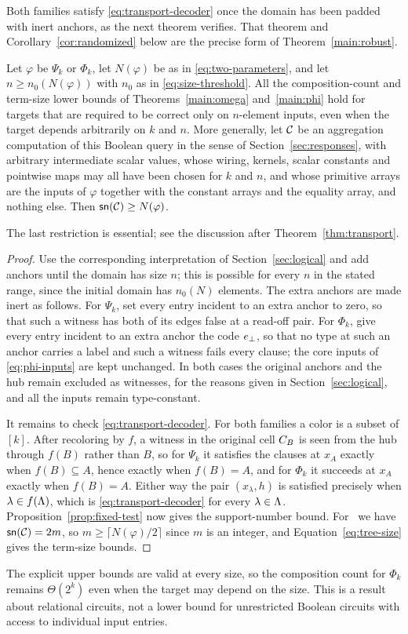Both families satisfy \eqref{eq:transport-decoder} once the domain has been
padded with inert anchors, as the next theorem verifies. That theorem and
Corollary~\ref{cor:randomized} below are the precise form of
Theorem~\ref{main:robust}.
\begin{theorem}\label{thm:fixed-size}
Let $\varphi$ be $\Psi_k$ or $\Phi_k$, let $N(\varphi)$ be as in
\eqref{eq:two-parameters}, and let $n\ge n_0(N(\varphi))$ with $n_0$ as in
\eqref{eq:size-threshold}. All the composition-count and term-size lower
bounds of Theorems~\ref{main:omega} and~\ref{main:phi} hold for targets that
are required to be correct only on $n$-element inputs, even when the target
depends arbitrarily on $k$ and $n$.
More generally, let $\mathcal C$ be an aggregation computation of this Boolean
query in the sense of Section~\ref{sec:responses}, with arbitrary
intermediate scalar values, whose wiring, kernels, scalar constants and
pointwise maps may all have been chosen for $k$ and $n$, and whose primitive
arrays are the inputs of $\varphi$ together with the constant arrays and the
equality array, and nothing else. Then $\mathsf{sn}(\mathcal C)\ge N(\varphi)$.
\end{theorem}
The last restriction is essential; see the discussion after
Theorem~\ref{thm:transport}.
\begin{proof}
Use the corresponding interpretation of Section~\ref{sec:logical} and add
anchors until the domain has size $n$; this is possible for every $n$ in
the stated range, since the initial domain has $n_0(N)$ elements. The extra
anchors are made inert as follows. For $\Psi_k$, set every entry incident
to an extra anchor to
zero, so that such a witness has both of its edges false at a read-off
pair. For $\Phi_k$, give every entry incident to an extra anchor the code
$e_{\bot}$, so that no type at such an anchor carries a label and such a witness
fails every clause; the core inputs of \eqref{eq:phi-inputs} are kept
unchanged. In both cases the original anchors
and the hub remain excluded as witnesses, for the reasons given in
Section~\ref{sec:logical}, and all the inputs remain type-constant.

It remains to check \eqref{eq:transport-decoder}. For both families a color
is a subset of $[k]$. After recoloring by $f$, a witness in the original
cell $C_{B}$ is seen from the hub through $f(B)$ rather than $B$, so for
$\Psi_k$ it satisfies the clauses at $x_A$ exactly when $f(B)\subseteq A$,
hence exactly when $f(B)=A$, and for $\Phi_k$ it succeeds at $x_A$ exactly
when $f(B)=A$. Either way the pair $(x_\lambda,h)$ is satisfied precisely
when $\lambda\in f(\Lambda)$, which is \eqref{eq:transport-decoder} for every
$\lambda\in\Lambda$.
Proposition~\ref{prop:fixed-test} now gives the support-number bound. For
\CoR\ we have $\mathsf{sn}(\mathcal C)=2m$, so $m\ge\lceil N(\varphi)/2\rceil$ since $m$
is an integer, and Equation~\eqref{eq:tree-size} gives the term-size bounds.
\end{proof}
The explicit upper bounds are valid at every size, so the composition count
for $\Phi_k$ remains $\Theta(2^k)$ even when the target may depend on the
size. This is a result about relational circuits, not a lower bound for
unrestricted Boolean circuits with access to individual input entries.

